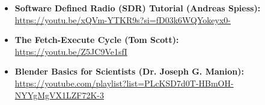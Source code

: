 \begin{itemize}
  \item\textbf{Software Defined Radio (SDR) Tutorial (Andreas Spiess):}\\
\url{https://youtu.be/xQVm-YTKR9s?si=fD03k6WQYokeyx0-}

  \item\textbf{The Fetch-Execute Cycle (Tom Scott):}\\
\url{https://youtu.be/Z5JC9Ve1sfI}

  \item\textbf{Blender Basics for Scientists (Dr. Joseph G. Manion):}\\
\url{https://youtube.com/playlist?list=PLcKSD7d0T-HBmOH-NYYgMgVX1LZF72K-3}\\

\end{itemize}
